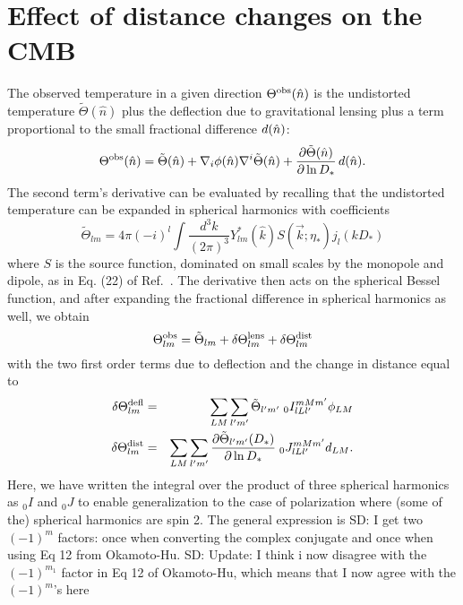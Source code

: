 \documentclass[prl,amsmath,amssymb,floatfix,superscriptaddress,nofootinbib,twocolumn]{revtex4-1}
\def\be{\begin{equation}}
\def\ee{\end{equation}}
\def\bea{\begin{eqnarray}}
\def\eea{\end{eqnarray}}
\newcommand{\eql}[1]{\label{eq:#1}}
\newcommand{\scott}[1]{{\color{darkgreen} SD: #1}}
\newcommand{\wh}[1]{{\color{red} WH: #1}}
\begin{document}
\section{Effect of distance changes on the CMB}
\newcommand\dtl{\delta\Theta^{\rm defl}}
\newcommand\dtd{\delta\Theta^{\rm dist}}
\newcommand\tob{\Theta^{\rm obs}}
\newcommand\tu{\tilde{\Theta}}
\newcommand\td{\Theta^{\rm dist}}
The %
observed temperature in a given direction $\tob(\hat n)$ is the undistorted temperature $\tu(\hat n)$ plus the deflection due to gravitational lensing plus a term proportional to the small fractional difference $d(\hat n)$:
\be
\tob(\hat n) = \tu(\hat n) + \nabla_{i} \phi(\hat n) \nabla^{i}\tu(\hat n) + \frac{\partial\tu(\hat n)}{\partial \ln D_*}\, \fd(\hat n)
.\ee
%
%
%
%
The second term's derivative can be evaluated by recalling that the undistorted temperature can be expanded in spherical harmonics with coefficients
\be
\tu_{lm} = 4\pi(-i)^{l} \int \frac{d^{3}k}{(2\pi)^{3}}Y_{lm}^{*}(\hat{k})S(\vec k;\eta_{*})j_{l}(kD_{*}) 
\ee
where $S$ is the source function, dominated on small scales by the monopole and dipole, as in Eq. (22) of Ref.~\cite{Hu:2001bc}. The derivative then acts on the spherical Bessel function, and after expanding the fractional difference in spherical harmonics as well, we obtain
\be
\tob_{lm} = \tu_{lm} +\delta \Theta_{lm}^{\rm lens}+ \delta \td_{lm}
\ee
with the two first order terms due to deflection and the change in distance equal to
\bea
\dtl_{lm} &=& \sum_{LM}\sum_{l'm'}\tu_{l'm'} \;{}_{0}I_{lLl'}^{mMm'}\phi_{LM}\\
\dtd_{lm} &=& \sum_{LM}\sum_{l'm'} \frac{\partial \tu_{l'm'}(D_{*})}{\partial \ln D_{*}} \;{}_{0} J_{lLl'}^{mMm'}d_{LM}\eql{dtd}
.\eea
Here, we have written the integral over the product of three spherical harmonics as $_0I$ and $_0J$ to enable generalization to the case of polarization where (some of the) spherical harmonics are spin 2. The general expression is  \scott{I get two $(-1)^m$ factors: once when converting the complex conjugate and once when using Eq 12 from Okamoto-Hu.}\scott{Update: I think i now disagree with the $(-1)^{m_1}$ factor in Eq 12 of Okamoto-Hu, which means that I now agree with the $(-1)^m$'s here}
\end{document}
